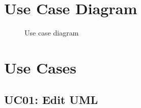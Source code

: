 \documentclass[12pt]{article}
\begin{document}
    \section{Use Case Diagram}

    \begin{figure}[htbp]
        \centering
        
        \caption{Use case diagram}
    \end{figure}


    \section{Use Cases}

    \subsection{UC01: Edit UML}
\end{document}
